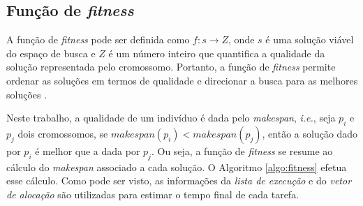 \subsection{Função de \textit{fitness}} \label{ssec:fitness}

A função de \textit{fitness} pode ser definida como $f: s \rightarrow Z$, onde $s$ é uma solução viável do espaço de busca e $Z$ é um número inteiro que quantifica a qualidade da solução representada pelo cromossomo. Portanto, a função de \textit{fitness} permite ordenar as soluções em termos de qualidade e direcionar a busca para as melhores soluções \cite{Talbi2009}.


Neste trabalho, a qualidade de um indivíduo é dada pelo \textit{makespan}, \textit{i.e.}, seja $p_i$ e $p_j$ dois cromossomos, se $makespan(p_i) < makespan(p_j)$, então a solução dado por $p_i$ é melhor que a dada por $p_j$. Ou seja, a função de \textit{fitness} se resume ao cálculo do \textit{makespan} associado a cada solução. O Algoritmo \ref{algo:fitness} efetua esse cálculo. Como pode ser visto, as informações da \textit{lista de execução} e do \textit{vetor de alocação} são utilizadas para estimar o tempo final de cada tarefa.


